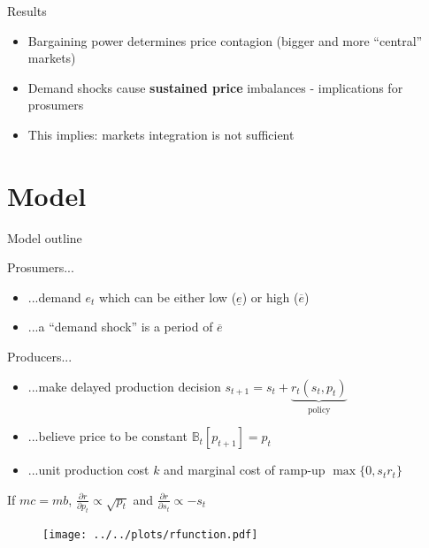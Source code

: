 \documentclass{beamer}
\newcommand{\B}{\mathbb{B}}
\begin{document}
\begin{frame}{Results}
    \begin{itemize} \setlength\itemsep{1.5em}
              \pause \item Bargaining power determines price contagion (bigger and more ``central'' markets)
              \pause \item Demand shocks cause \textbf{sustained price} imbalances - implications for prosumers
              \pause \item This implies: markets integration is not sufficient
    \end{itemize}
\end{frame}

\section{Model}

\begin{frame}{Model outline}
    \centering
    \resizebox{\textwidth}{!}{}
\end{frame}

\begin{frame}
    Prosumers...
    \begin{itemize} \setlength\itemsep{1.5em}
              \pause \item ...demand $e_t$ which can be either low ($\underline{e}$) or high ($\overline{e}$)
              \pause \item ...a ``demand shock'' is a period of $\overline{e}$
    \end{itemize}
\end{frame}


\begin{frame}

    Producers...
    \begin{itemize} \setlength\itemsep{1.5em}
              \pause \item ...make delayed production decision $s_{t+1} = s_t + \underbrace{r_t(s_t, p_t)}_{\text{policy}}$
              \pause \item ...believe price to be constant $\B_t[p_{t+1}] = p_t$
              \pause \item ...unit production cost $k$ and marginal cost of ramp-up $\max\{0, s_t r_t\}$
    \end{itemize}

\end{frame}

\begin{frame}
    If $mc = mb$, $\frac{\partial r}{\partial p_t} \propto \sqrt{p_t}$ and $\frac{\partial r}{\partial s_t} \propto - s_t$

    \begin{figure}
        \texttt{[image: ../../plots/rfunction.pdf]}
    \end{figure}
\end{frame}
\end{document}
